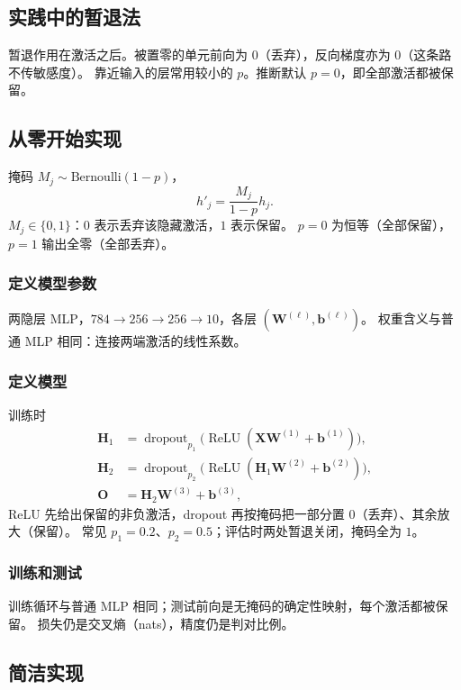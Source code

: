 \subsection{实践中的暂退法}

暂退作用在激活之后。被置零的单元前向为 $0$（丢弃），反向梯度亦为 $0$（这条路不传敏感度）。
靠近输入的层常用较小的 $p$。推断默认 $p=0$，即全部激活都被保留。

\subsection{从零开始实现}

掩码 $M_{j}\sim\mathrm{Bernoulli}(1-p)$，
\[
h'_{j}=\frac{M_{j}}{1-p}h_{j}.
\]
$M_j\in\{0,1\}$：$0$ 表示丢弃该隐藏激活，$1$ 表示保留。
$p=0$ 为恒等（全部保留），$p=1$ 输出全零（全部丢弃）。

\subsubsection{定义模型参数}

两隐层 MLP，$784\to 256\to 256\to 10$，各层 $(\bm{W}^{(\ell)},\bm{b}^{(\ell)})$。
权重含义与普通 MLP 相同：连接两端激活的线性系数。

\subsubsection{定义模型}

训练时
\begin{align*}
\bm{H}_{1}&=\operatorname{dropout}_{p_{1}}\bigl(\operatorname{ReLU}(\bm{X}\bm{W}^{(1)}+\bm{b}^{(1)})\bigr),\\
\bm{H}_{2}&=\operatorname{dropout}_{p_{2}}\bigl(\operatorname{ReLU}(\bm{H}_{1}\bm{W}^{(2)}+\bm{b}^{(2)})\bigr),\\
\bm{O}&=\bm{H}_{2}\bm{W}^{(3)}+\bm{b}^{(3)},
\end{align*}
ReLU 先给出保留的非负激活，dropout 再按掩码把一部分置 $0$（丢弃）、其余放大（保留）。
常见 $p_{1}=0.2$、$p_{2}=0.5$；评估时两处暂退关闭，掩码全为 $1$。

\subsubsection{训练和测试}

训练循环与普通 MLP 相同；测试前向是无掩码的确定性映射，每个激活都被保留。
损失仍是交叉熵（nats），精度仍是判对比例。

\subsection{简洁实现}

